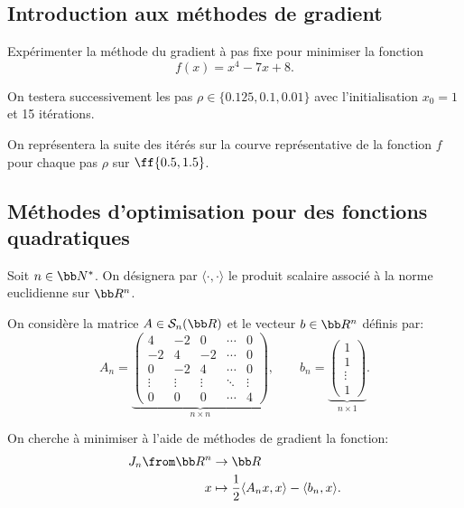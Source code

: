 \subsection*{Introduction aux méthodes de gradient}\label{ssec:1}

Expérimenter la méthode du gradient à pas fixe pour minimiser la fonction
\begin{equation*}
    f(x) = x^4 - 7x + 8.
\end{equation*}

On testera successivement les pas \(\rho \in \{0.125, 0.1, 0.01\}\)
avec l'initialisation \(x_0 = 1\) et 15 itérations.

On représentera la suite des itérés sur la courve représentative
de la fonction \(f\) pour chaque pas \(\rho\) sur \(\ff{0.5, 1.5}\).

\subsection{Méthodes d'optimisation pour des fonctions quadratiques}\label{ssec:2}

Soit \(n\in\bb N^\ast\). On désignera par \(\langle \cdot,\cdot \rangle\)
le produit scalaire associé à la norme euclidienne sur \(\bb R^n\).

On considère la matrice \(A\in\mathcal{S}_n(\bb R)\) et le vecteur
\(b\in\bb R^n\) définis par:
\begin{equation*}
    A_n = \underbrace{
    \begin{pmatrix}
        4 & -2 & 0 & \cdots & 0 \\
        -2 & 4 & -2 & \cdots & 0 \\
        0 & -2 & 4 & \cdots & 0 \\
        \vdots & \vdots & \vdots & \ddots & \vdots \\
        0 & 0 & 0 & \cdots & 4
    \end{pmatrix}}_{\text{\(n\times n\)}},
    \qquad
    b_n = \underbrace{
    \begin{pmatrix}
        1 \\ 1 \\ \vdots \\ 1
    \end{pmatrix}}_{\text{\(n\times 1\)}}.
\end{equation*}

On cherche à minimiser à l'aide de méthodes de gradient
la fonction:
\begin{equation*}
    \begin{aligned}
        J_n\from \bb R^n &\to \bb R \\
        x &\mapsto \frac12 \langle A_n x,x \rangle - \langle b_n,x \rangle.
    \end{aligned}
\end{equation*}

